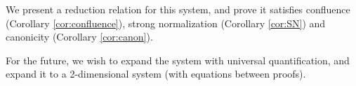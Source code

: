 We present a reduction relation for this system, and prove it satisfies confluence (Corollary \ref{cor:confluence}), strong normalization (Corollary \ref{cor:SN}) and canonicity (Corollary \ref{cor:canon}).

For the future, we wish to expand the system with universal quantification, and expand it to a 2-dimensional system (with equations between proofs).














